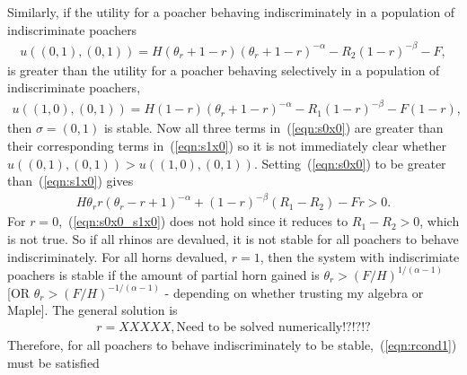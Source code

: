 \documentclass[10pt]{article}
\begin{document}
Similarly, if the utility for a poacher behaving indiscriminately in a population of indiscriminate poachers
\begin{eqnarray}
\label{eqn:s0x0}
 u((0,1),(0,1)) = H(\theta_r + 1 - r)(\theta_r + 1 - r)^{-\alpha} - R_2(1-r)^{-\beta} - F,
\end{eqnarray}
is greater than the utility for a poacher behaving selectively in a population of indiscriminate poachers,
\begin{eqnarray}
\label{eqn:s1x0}
u((1,0),(0,1)) = H(1 -r)(\theta_r + 1 - r)^{-\alpha} - R_1(1-r)^{-\beta} - F(1-r),
\end{eqnarray} 
then $\sigma = (0,1)$ is stable. Now all three terms in~(\ref{eqn:s0x0}) are greater than their corresponding terms in~(\ref{eqn:s1x0}) so it is not immediately clear whether $u((0,1),(0,1)) > u((1,0),(0,1))$. Setting~(\ref{eqn:s0x0}) to be greater than~(\ref{eqn:s1x0}) gives
\begin{eqnarray}
\label{eqn:s0x0_s1x0}
H\theta_r r (\theta_r - r + 1)^{-\alpha} + (1-r)^{-\beta}(R_1-R_2) - Fr > 0.
\end{eqnarray}
For $r = 0$,~(\ref{eqn:s0x0_s1x0}) does not hold since it reduces to $R_1-R_2 > 0$, which is not true. So if all rhinos are devalued, it is not stable for all poachers to behave indiscriminately. For all horns devalued, $r=1$, then the system with indiscrimiate poachers is stable if the amount of partial horn gained is $\theta_r > (F/H)^{1/(\alpha-1)}$ [OR $\theta_r > (F/H)^{-1/(\alpha-1)}$ - depending on whether trusting my algebra or Maple]. The general solution is 
\begin{eqnarray}
\label{eqn:rcond1}
r = XXXXX,\mbox{Need to be solved numerically!?!?!?}
\end{eqnarray}
Therefore, for all poachers to behave indiscriminately to be stable,~(\ref{eqn:rcond1}) must be satisfied
\end{document}
